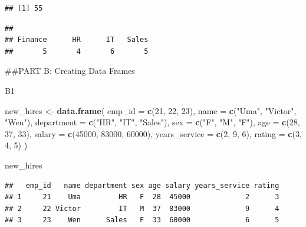 \documentclass[
]{article}
\newenvironment{Shaded}{\begin{snugshade}}{\end{snugshade}}
\newcommand{\AttributeTok}[1]{\textcolor[rgb]{0.13,0.29,0.53}{#1}}
\newcommand{\DecValTok}[1]{\textcolor[rgb]{0.00,0.00,0.81}{#1}}
\newcommand{\FunctionTok}[1]{\textcolor[rgb]{0.13,0.29,0.53}{\textbf{#1}}}
\newcommand{\NormalTok}[1]{#1}
\newcommand{\OtherTok}[1]{\textcolor[rgb]{0.56,0.35,0.01}{#1}}
\newcommand{\SpecialCharTok}[1]{\textcolor[rgb]{0.81,0.36,0.00}{\textbf{#1}}}
\newcommand{\StringTok}[1]{\textcolor[rgb]{0.31,0.60,0.02}{#1}}
\begin{document}
\begin{verbatim}
## [1] 55
\end{verbatim}

\begin{Shaded}
\end{Shaded}

\begin{verbatim}
## 
## Finance      HR      IT   Sales 
##       5       4       6       5
\end{verbatim}

\#\#PART B: Creating Data Frames

B1

\begin{Shaded}
\begin{Highlighting}[]
\NormalTok{new\_hires }\OtherTok{\textless{}{-}} \FunctionTok{data.frame}\NormalTok{(}
  \AttributeTok{emp\_id =} \FunctionTok{c}\NormalTok{(}\DecValTok{21}\NormalTok{, }\DecValTok{22}\NormalTok{, }\DecValTok{23}\NormalTok{),}
  \AttributeTok{name =} \FunctionTok{c}\NormalTok{(}\StringTok{"Uma"}\NormalTok{, }\StringTok{"Victor"}\NormalTok{, }\StringTok{"Wen"}\NormalTok{),}
  \AttributeTok{department =} \FunctionTok{c}\NormalTok{(}\StringTok{"HR"}\NormalTok{, }\StringTok{"IT"}\NormalTok{, }\StringTok{"Sales"}\NormalTok{),}
  \AttributeTok{sex =} \FunctionTok{c}\NormalTok{(}\StringTok{"F"}\NormalTok{, }\StringTok{"M"}\NormalTok{, }\StringTok{"F"}\NormalTok{),}
  \AttributeTok{age =} \FunctionTok{c}\NormalTok{(}\DecValTok{28}\NormalTok{, }\DecValTok{37}\NormalTok{, }\DecValTok{33}\NormalTok{),}
  \AttributeTok{salary =} \FunctionTok{c}\NormalTok{(}\DecValTok{45000}\NormalTok{, }\DecValTok{83000}\NormalTok{, }\DecValTok{60000}\NormalTok{),}
  \AttributeTok{years\_service =} \FunctionTok{c}\NormalTok{(}\DecValTok{2}\NormalTok{, }\DecValTok{9}\NormalTok{, }\DecValTok{6}\NormalTok{),}
  \AttributeTok{rating =} \FunctionTok{c}\NormalTok{(}\DecValTok{3}\NormalTok{, }\DecValTok{4}\NormalTok{, }\DecValTok{5}\NormalTok{)}
\NormalTok{)}

\NormalTok{new\_hires}
\end{Highlighting}
\end{Shaded}

\begin{verbatim}
##   emp_id   name department sex age salary years_service rating
## 1     21    Uma         HR   F  28  45000             2      3
## 2     22 Victor         IT   M  37  83000             9      4
## 3     23    Wen      Sales   F  33  60000             6      5
\end{verbatim}
\end{document}
